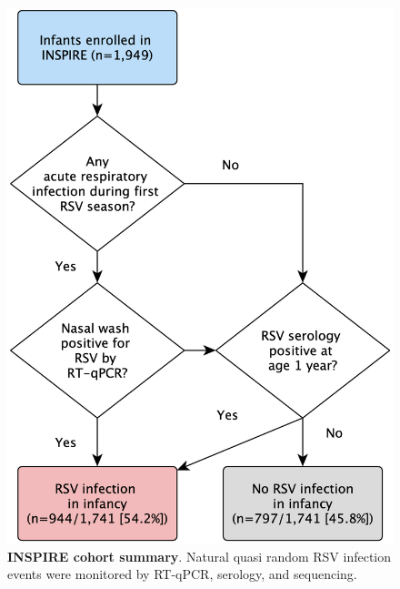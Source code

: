 \documentclass{article} %
\begin{document}
\begin{figure}[ht] \hspace*{0cm}  \begin{center}
    \includegraphics[scale=0.1]{f1_rsv_persist2022}
	\caption{\textbf{INSPIRE cohort summary}. Natural quasi random RSV infection events were monitored by RT-qPCR, serology, and sequencing.}
	\label{fig:1}
 \end{center} \end{figure}
 
\end{document}

